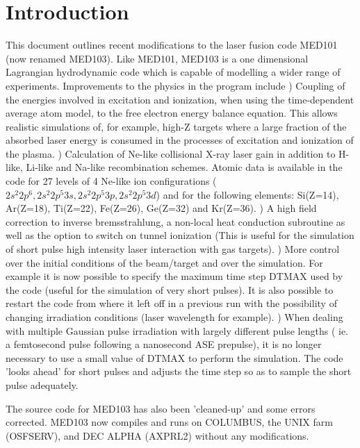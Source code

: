 \newpage 
\tableofcontents
\newpage
\section{Introduction}
This document outlines recent modifications to the laser
fusion code MED101 \cite{cpc,med101} (now renamed MED103).
Like MED101, MED103 is a one dimensional Lagrangian hydrodynamic
code which is capable of modelling a wider range of experiments.
Improvements to the physics in the program include 
) Coupling of the energies involved in excitation and ionization,
when using the time-dependent average atom model,
to the free electron energy balance equation\cite{djaoui1}. 
This allows realistic simulations  of, for example, 
high-Z targets where a large fraction 
of the absorbed laser energy is consumed in the processes of
excitation and ionization of the plasma. 
) Calculation of Ne-like collisional X-ray laser gain \cite{djaoui1} in 
addition to 
H-like, Li-like and Na-like recombination schemes.
Atomic data \cite{Bhatia}
is available in the code for 27 levels 
of 4 Ne-like ion configurations
($2s^2 2p^6, 2s^2 2p^5 3s, 2s^2 2p^5 3p, 2s^2 2p^5 3d$)
and for the following elements:
Si(Z=14), 
Ar(Z=18), Ti(Z=22), Fe(Z=26), Ge(Z=32) and Kr(Z=36).
) A high field correction to inverse bremsstrahlung, 
a non-local heat conduction subroutine \cite{djaoui2} as well
as the option to switch on tunnel ionization (This is useful 
for the simulation of short pulse high intensity laser interaction with gas 
targets).
) More control over the initial conditions of the beam/target and over the simulation.
For example it is now possible to specify the maximum time step DTMAX used by the
code (useful for the simulation of very short pulses). 
It is also possible to restart the code from where it left off in a previous run 
with the possibility of changing irradiation conditions (laser wavelength for example).
) When dealing with
multiple Gaussian pulse irradiation  with largely different pulse lengths ( ie.  
a femtosecond pulse following  a nanosecond ASE prepulse), 
it is no longer necessary to use a small value of DTMAX
to perform the simulation. 
The code 'looks ahead' for short pulses and adjusts the time step so as to sample
the short pulse adequately.

 
The source code for MED103 has also been 'cleaned-up' and some 
errors corrected.
MED103 now compiles and runs 
on COLUMBUS, the UNIX farm (OSFSERV), and DEC 
ALPHA (AXPRL2) without any modifications.
 
